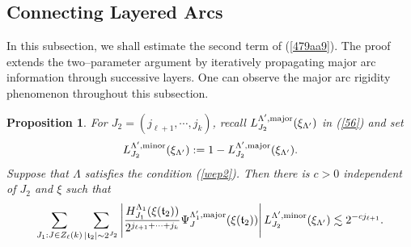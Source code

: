 \documentclass[11 pt,letterpaper]{amsart}
\theoremstyle{plain}
\newtheorem{proposition}{Proposition}\numberwithin{proposition}{section}
\theoremstyle{definition}
\theoremstyle{remark} \theoremstyle{exam} \theoremstyle{ob}
\numberwithin{equation}{section}
\begin{document}
 
 
  
 \subsection{Connecting Layered Arcs}\label{sec5.2}
In this subsection, we shall estimate the second term of (\ref{479aa9}). 
The proof extends the two--parameter argument by iteratively propagating major arc information through successive layers. One can observe the major arc rigidity phenomenon  throughout this subsection. 

\begin{proposition}\label{prop5167b9}
For  $J_2=(j_{\ell+1},\cdots,j_k)$, recall $ L^{\Lambda',\rm{major}}_{J_2}(\xi_{\Lambda'})$ in (\ref{56}) and set
 $$ L^{\Lambda',\rm{minor}}_{J_2}(\xi_{\Lambda'}):= 1- L^{\Lambda',\rm{major}}_{J_2}(\xi_{\Lambda'}).$$  Suppose that $\Lambda$ satisfies   the  condition (\ref{wep2}).  Then
there is $c>0$  independent of $J_2$ and $\xi$ such that
\begin{align} 
\label{44gg9} \sum_{J_1:J\in Z_\ell(k)}\sum_{|\mathfrak{t}_{2}|\sim 2^{J_2}} \left| \frac{ H^{\Lambda_{1}}_{J_1}( \xi(\mathfrak{t}_2)) }{2^{j_{\ell+1}+\cdots+j_k}}
\Psi_{J}^{\Lambda'_1,\mathrm{major}}( \xi(\mathfrak{t}_2)) \right|L^{\Lambda',\rm{minor}}_{J_2}(\xi_{\Lambda'})\lesssim
 2^{-cj_{\ell+1}}.
\end{align} 
\end{proposition}
\end{document}

